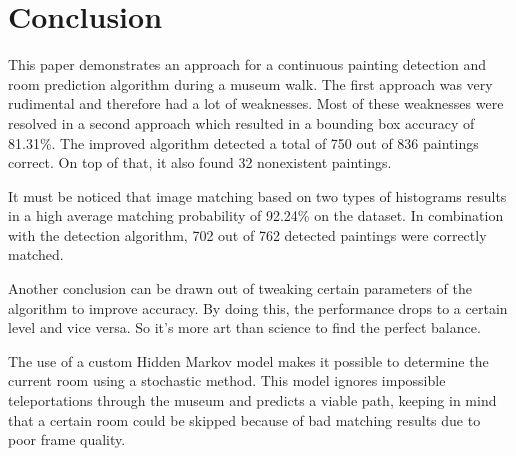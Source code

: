 \section{Conclusion}
\label{sec:conclusion}

This paper demonstrates an approach for a continuous painting detection and room prediction algorithm during a museum walk. The first approach was very rudimental and therefore had a lot of weaknesses. Most of these weaknesses were resolved in a second approach which resulted in a bounding box accuracy of 81.31\%. The improved algorithm detected a total of 750 out of 836 paintings correct. On top of that, it also found 32 nonexistent paintings.

It must be noticed that image matching based on two types of histograms results in a high average matching probability of 92.24\% on the dataset. In combination with the detection algorithm, 702 out of 762 detected paintings were correctly matched.

Another conclusion can be drawn out of tweaking certain parameters of the algorithm to improve accuracy. By doing this, the performance drops to a certain level and vice versa. So it's more art than science to find the perfect balance.

The use of a custom Hidden Markov model makes it possible to determine the current room using a stochastic method. This model ignores impossible teleportations through the museum and predicts a viable path, keeping in mind that a certain room could be skipped because of bad matching results due to poor frame quality.
